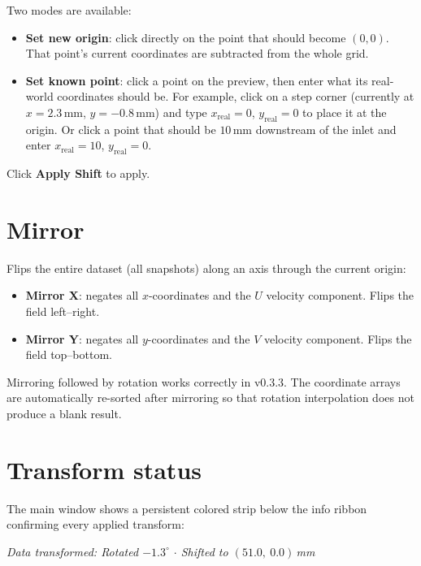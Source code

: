 \documentclass[11pt, a4paper]{report}
\newcommand{\uipth}[1]{\textbf{\textcolor{upblue}{#1}}}
\begin{document}
Two modes are available:

\begin{itemize}[leftmargin=1.5em]
  \item \textbf{Set new origin}: click directly on the point that should become $(0, 0)$. That point's current coordinates are subtracted from the whole grid.
  \item \textbf{Set known point}: click a point on the preview, then enter what its real-world coordinates should be. For example, click on a step corner (currently at $x = 2.3$\,mm, $y = -0.8$\,mm) and type \mbox{$x_\mathrm{real} = 0$}, $y_\mathrm{real} = 0$ to place it at the origin. Or click a point that should be $10$\,mm downstream of the inlet and enter $x_\mathrm{real} = 10$, $y_\mathrm{real} = 0$.
\end{itemize}

Click \uipth{Apply Shift} to apply.

\section{Mirror}

Flips the entire dataset (all snapshots) along an axis through the current origin:

\begin{itemize}[leftmargin=1.5em]
  \item \uipth{Mirror X}: negates all $x$-coordinates and the $U$ velocity component. Flips the field left--right.
  \item \uipth{Mirror Y}: negates all $y$-coordinates and the $V$ velocity component. Flips the field top--bottom.
\end{itemize}

\begin{notebox}
Mirroring followed by rotation works correctly in v0.3.3. The coordinate arrays are automatically re-sorted after mirroring so that rotation interpolation does not produce a blank result.
\end{notebox}

\section{Transform status}

The main window shows a persistent colored strip below the info ribbon confirming every applied transform:

\begin{center}
\textit{Data transformed: Rotated $-1.3^\circ$ $\cdot$ Shifted to $(51.0,\ 0.0)$\,mm}
\end{center}
\end{document}
